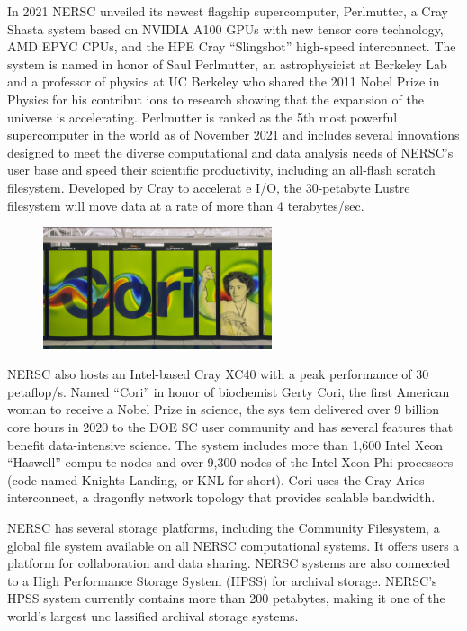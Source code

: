 In 2021 NERSC unveiled its newest flagship supercomputer, Perlmutter, a Cray Shasta system based on NVIDIA A100 GPUs with new tensor core technology, AMD EPYC CPUs, and the HPE Cray ``Slingshot'' high-speed interconnect. The system is named in honor of Saul Perlmutter, an astrophysicist at Berkeley Lab and a professor of physics at UC Berkeley who shared the 2011 Nobel Prize in Physics for his contribut
ions to research showing that the expansion of the universe is accelerating. Perlmutter is ranked as the 5th most powerful supercomputer in the world as of November 2021 and includes several innovations
designed to meet the diverse computational and data analysis needs of NERSC's user base and speed their scientific productivity, including  an all-flash scratch filesystem. Developed by Cray to accelerat
e I/O, the 30-petabyte Lustre filesystem will move data at a rate of more than 4 terabytes/sec.

\begin{figure}[ht]
 \begin{center}
    \includegraphics[width=0.6\textwidth]
    {images/cori.png}
 \end{center}
\end{figure}

NERSC also hosts an Intel-based Cray XC40 with a peak performance of 30 petaflop/s. Named ``Cori'' in honor of biochemist Gerty Cori, the first American woman to receive a Nobel Prize in science, the sys
tem delivered over 9 billion core hours in 2020 to the DOE SC user community and has several features that benefit data-intensive science. The system includes more than 1,600 Intel Xeon ``Haswell'' compu
te nodes and over 9,300 nodes of the Intel Xeon Phi processors (code-named Knights Landing, or KNL for short).  Cori uses the Cray Aries interconnect, a dragonfly network topology that provides scalable
bandwidth.

NERSC has several storage platforms, including the Community Filesystem, a global file system available on all NERSC computational systems. It offers users a platform for collaboration and data sharing.
NERSC systems are also connected to a High Performance Storage System (HPSS) for archival storage. NERSC's HPSS system currently contains more than 200 petabytes, making it one of the world's largest unc
lassified archival storage systems.


